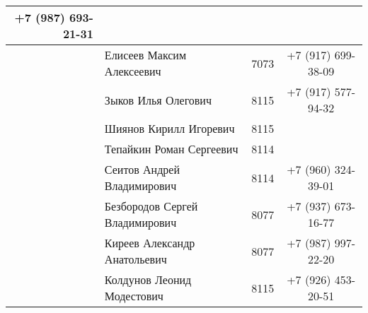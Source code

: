 \documentclass[a4paper,12pt]{article} %
\newcounter{magicrownumbers}
\newcommand\rownumber{\stepcounter{magicrownumbers}\arabic{magicrownumbers}}
\begin{document}
\begin{longtable}{r|l|c|c}
		+7 (987) 693-21-31\\
		\midrule
		\rownumber & Елисеев Максим Алексеевич & 7073 &
		+7 (917) 699-38-09\\
		\midrule
		\rownumber & Зыков Илья Олегович & 8115 &
		+7 (917) 577-94-32\\
		\midrule
		\rownumber & Шиянов Кирилл Игоревич & 8115 &\\
		\midrule
		\rownumber & Тепайкин Роман Сергеевич & 8114 & 	\\
		\midrule
		\rownumber & Сеитов Андрей Владимирович & 8114 &
		+7 (960) 324-39-01\\
		\midrule
		\rownumber & Безбородов Сергей Владимирович & 8077 &
		+7 (937) 673-16-77\\
		\midrule
		\rownumber & Киреев Александр Анатольевич & 8077 &
		+7 (987) 997-22-20\\
		\midrule
		\rownumber & Колдунов Леонид Модестович & 8115 &
		+7 (926) 453-20-51\\
		\bottomrule
	\end{longtable}
\end{document}
